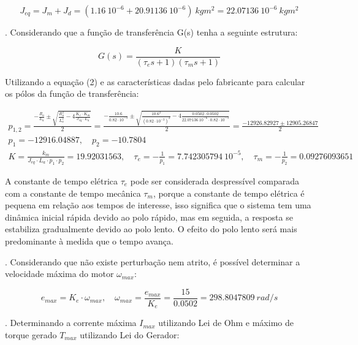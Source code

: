 \documentclass[10pt]{article}
\begin{document}
\begin{equation}
    J_{eq} = J_m + J_d = (1.16 \ 10^{-6} + 20.91136 \ 10^{-6}) \ kgm^2
    = 22.07136 \ 10^{-6} \ kgm^2
\end{equation}

. Considerando que a função de transferência G(s) tenha a seguinte estrutura:

\begin{equation}
    G(s) = \frac{K}{(\tau_e s + 1)(\tau_m s + 1)}
\end{equation}

\quad Utilizando a equação (2) e as características dadas pelo fabricante para calcular
os pólos da função de transferência:

\begin{equation}
\begin{aligned}
    p_{1,2} = \frac{-\frac{R_a}{L_a} \pm \sqrt{\frac{R_a^2}{L_a^2} - 4\frac{K_e \cdot K_m}{J_{eq} \cdot L_a}}}{2}
    = \frac{-\frac{10.6}{0.82 \cdot 10^{-3}} \pm \sqrt{\frac{10.6^2}{(0.82 \cdot 10^{-3})^2} - 4\frac{0.0502 \cdot 0.0502}{22.07136 \ 10^{-6} \cdot 0.82 \cdot 10^{-3}}}}{2}
    = \frac{-12926.82927 \pm 12905.26847}{2} \\
    p_1 = -12916.04887, \quad p_2 = -10.7804 \\
    K = \frac{k_m}{J_{eq} \cdot L_a \cdot p_1 \cdot p_2} = 19.92031563, \quad \tau_e = -\frac{1}{p_1} = 7.742305794 \ 10^{-5}, \quad \tau_m = -\frac{1}{p_2} = 0.09276093651
\end{aligned}
\end{equation}

\quad A constante de tempo elétrica $\tau_e$ pode ser considerada despressível
comparada com a constante de tempo mecânica $\tau_m$,
porque a constante de tempo elétrica é pequena em relação aos tempos de interesse,
isso significa que o sistema tem uma dinâmica inicial rápida devido ao polo rápido,
mas em seguida, a resposta se estabiliza gradualmente devido ao polo lento.
O efeito do polo lento será mais predominante à medida que o tempo avança.

. Considerando que não existe perturbação nem atrito,
é possível determinar a velocidade máxima do motor $\omega_{max}$:

\begin{equation}
    e_{max} = K_e \cdot \omega_{max},
    \quad \omega_{max} = \frac{e_{max}}{K_e} = \frac{15}{0.0502} = 298.8047809 \ rad/s
\end{equation}

. Determinando a corrente máxima $I_{max}$ utilizando Lei de Ohm e máximo de torque gerado $T_{max}$ utilizando Lei do Gerador:
\end{document}
